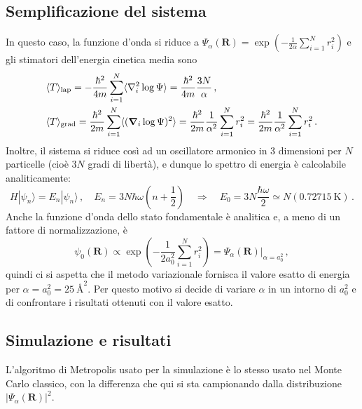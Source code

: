 \documentclass[a4paper, titlepage]{article}
\begin{document}
\subsection{Semplificazione del sistema}
In questo caso, la funzione d'onda si riduce a $\displaystyle \Psi_\alpha(\mathbf{R}) = \exp(-\frac{1}{2\alpha}\sum_{i = 1}^Nr_i^2)$ e gli stimatori dell'energia cinetica media sono
\begin{align*}
    &\langle T \rangle _{\rm lap} = -\frac{\hbar^2}{4m}
    \sum_{i = 1}^N
    \langle\nabla_i^2\log\Psi\rangle = \frac{\hbar^2}{4m} \frac{3N}{\alpha}\, ,\\
    &\langle T \rangle _{\rm grad} = \frac{\hbar^2}{2m}
    \sum_{i = 1}^N
    \langle(\boldsymbol{\nabla}_i\log\Psi)^2\rangle =
    \frac{\hbar^2}{2m} \frac{1}{\alpha^2}
    \sum_{i=1}^N r_i^2 = \frac{\hbar^2}{2m} \frac{1}{\alpha^2}\sum_{i=1}^N r_i^2\, .
\end{align*}
Inoltre, il sistema si riduce così ad un oscillatore armonico in 3 dimensioni per $N$ particelle (cioè $3N$ gradi di libertà), e dunque lo spettro di energia è calcolabile analiticamente:
\begin{equation}
H|\psi_n\rangle = E_n|\psi_n\rangle \, , \quad
E_n = 3N\hbar\omega\left(n + \frac{1}{2}\right) \quad \Rightarrow \quad E_0 = 3N\frac{\hbar\omega}{2} \simeq N(0.72715\ \unit{\kelvin})\, .
\label{eq:NOINT_ground}
\end{equation}
Anche la funzione d'onda dello stato fondamentale è analitica e, a meno di un fattore di normalizzazione, è
\[
\psi_0(\mathbf{R}) \propto \exp\left(-\frac{1}{2a_0^2}\sum_{i = 1}^Nr_i^2\right) = \Psi_\alpha(\mathbf{R})|_{\alpha = a_0^2}\, ,
\]
quindi ci si aspetta che il metodo variazionale fornisca il valore esatto di energia per $\alpha = a_0^2 = 25\ \unit{\angstrom\squared}$. Per questo motivo si decide di variare $\alpha$ in un intorno di $a_0^2$ e di confrontare i risultati ottenuti con il valore esatto.

\subsection{Simulazione e risultati}
L'algoritmo di Metropolis usato per la simulazione è lo stesso usato nel Monte Carlo classico, con la differenza che qui si sta campionando dalla distribuzione $|\Psi_\alpha(\mathbf{R})|^2$. 
\end{document}
